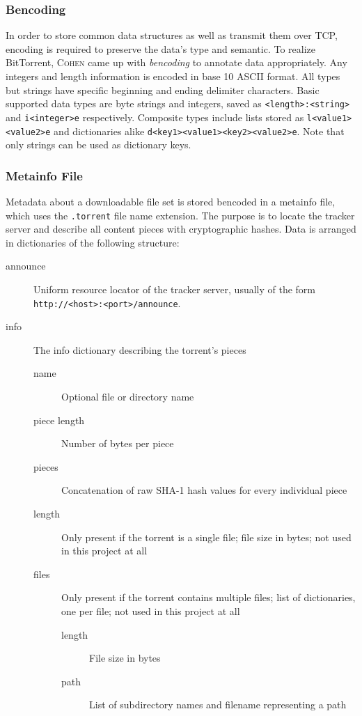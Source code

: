 \documentclass[10pt, a4paper]{scrartcl} %
\renewcommand{\_}{\origunderscore\allowbreak}
\begin{document}
\subsubsection{Bencoding}
In order to store common data structures as well as transmit them over TCP, encoding is required to preserve the data's type and semantic. To realize BitTorrent, \textsc{Cohen} came up with \emph{bencoding} to annotate data appropriately. Any integers and length information is encoded in base 10 ASCII format. All types but strings have specific beginning and ending delimiter characters. Basic supported data types are byte strings and integers, saved as \texttt{<length>:<string>} and \texttt{i<integer>e} respectively. Composite types include lists stored as \texttt{l<value1><value2>e} and dictionaries alike \texttt{d<key1><value1><key2><value2>e}. Note that only strings can be used as dictionary keys.

\subsubsection{Metainfo File}
Metadata about a downloadable file set is stored bencoded in a metainfo file, which uses the \texttt{.torrent} file name extension. The purpose is to locate the tracker server and describe all content pieces with cryptographic hashes. Data is arranged in dictionaries of the following structure:

\begin{description}
  \item[announce] Uniform resource locator of the tracker server, usually of the form \nolinkurl{http://<host>:<port>/announce}.
  \item[info] The info dictionary describing the torrent's pieces
  \begin{description}
    \item[name] Optional file or directory name
    \item[piece length] Number of bytes per piece
    \item[pieces] Concatenation of raw SHA-1 hash values for every individual piece
    \item[length] Only present if the torrent is a single file; file size in bytes; not used in this project at all
    \item[files] Only present if the torrent contains multiple files; list of dictionaries, one per file; not used in this project at all
    \begin{description}
      \item[length] File size in bytes
      \item[path] List of subdirectory names and filename representing a path
    \end{description}
  \end{description}
\end{description}
\end{document}
